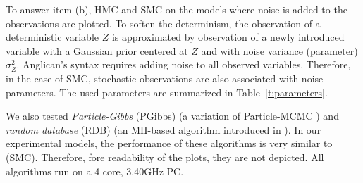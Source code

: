 \documentclass[letterpaper]{article}
\begin{document}
To answer item (b), HMC and SMC on the models where noise is added to the observations are plotted. 
%
To soften the determinism, %
the observation of a deterministic variable $Z$ %
is approximated by observation of a newly introduced variable 
with a Gaussian prior centered at $Z$ and with noise variance (parameter) $\sigma^2_{Z}$. 
Anglican's syntax requires %
adding noise to all observed variables. Therefore, in the case of SMC, stochastic observations are also associated with noise parameters.
The used parameters are summarized in Table~\ref{t:parameters}.
%

We also tested \emph{Particle-Gibbs} (PGibbs) (a variation of Particle-MCMC \cite{andrieu2010particle}) 
and \emph{random database} (RDB) (an MH-based algorithm introduced in \cite{wingate2011lightweight}).
In our experimental models, the performance of these algorithms is very similar to (SMC). Therefore, fore readability of the plots, they are not depicted. 
% 
All algorithms run on a 4 core, 3.40GHz PC.%
\end{document}

